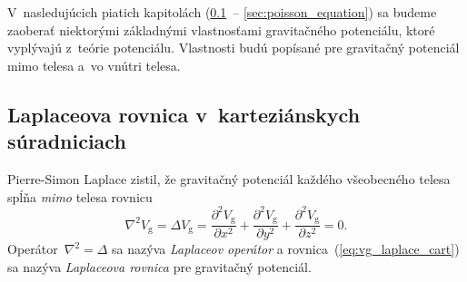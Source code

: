 \documentclass[a4paper,12pt]{book}
\newcommand{\gidx}{\mathrm g}
\begin{document}
V~nasledujúcich piatich kapitolách (\ref{sec:laplace_equation_cart}~--
\ref{sec:poisson_equation}) sa budeme zaoberať niektorými základnými
vlastnosťami gravitačného potenciálu, ktoré vyplývajú z~teórie potenciálu.
Vlastnosti budú popísané pre gravitačný potenciál mimo telesa a~vo vnútri
telesa.





\subsection{Laplaceova rovnica v~karteziánskych súradniciach}
\label{sec:laplace_equation_cart}

Pierre-Simon Laplace zistil, že gravitačný potenciál každého všeobecného telesa
spĺňa \emph{mimo} telesa rovnicu
%
\begin{equation}
\label{eq:vg_laplace_cart}
\nabla^2 V_\gidx = \Delta V_\gidx = \frac{\partial^2 V_\gidx}{\partial x^2}
+ \frac{\partial^2 V_\gidx}{\partial y^2} + \frac{\partial^2 V_\gidx}{\partial
z^2} = 0{.}
\end{equation}
%
Operátor~$\nabla^2 = \Delta$ sa nazýva \emph{Laplaceov operátor} 
a rovnica~(\ref{eq:vg_laplace_cart}) sa nazýva \emph{Laplaceova rovnica} pre
gravitačný potenciál.
\end{document}
